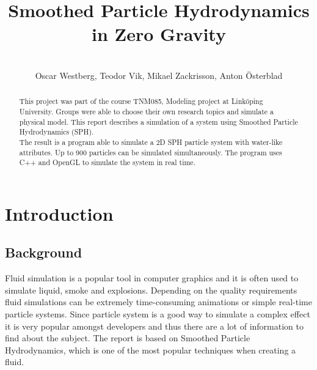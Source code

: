 \documentclass[a4paper,12pt,twoside,final]{report}
\begin{document}
\pagestyle{plain}


\title{Smoothed Particle Hydrodynamics in Zero Gravity}
\author{ \\ Oscar Westberg, Teodor Vik, Mikael Zackrisson, Anton Österblad}
\maketitle

\thispagestyle{empty}
\newpage{}

\setcounter{page}{2}
\renewcommand{\abstractname}{Summary}
\begin{abstract}
This project was part of the course TNM085, Modeling project at Linköping University. Groups were able to choose their own research topics and simulate a physical model. This report describes a simulation of a system using Smoothed Particle Hydrodynamics (SPH). \\

\noindent The result is a program able to simulate a 2D SPH particle system with water-like attributes. Up to 900 particles can be simulated simultaneously. The program uses C++ and OpenGL to simulate the system in real time.
\vfill
\end{abstract}
\newpage{}

\tableofcontents  %
\listoffigures    %
\listoftables     %


\chapter{Introduction}


\section{Background}
Fluid simulation is a popular tool in computer graphics \cite{auer08} and it is often used to simulate liquid, smoke and explosions. Depending on the quality requirements fluid simulations can be extremely time-consuming animations or simple real-time particle systems. Since particle system is a good way to simulate a complex effect it is very popular amongst developers and thus there are a lot of information to find about the subject. The report is based on Smoothed Particle Hydrodynamics, which is one of the most popular techniques when creating a fluid.
\end{document}
